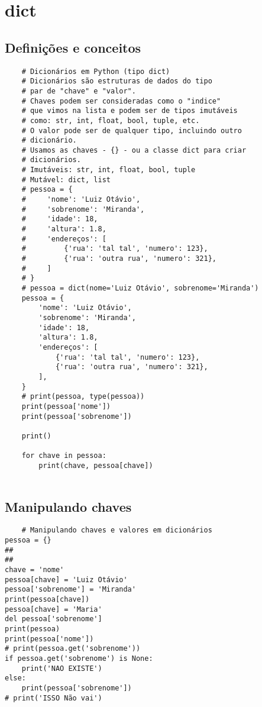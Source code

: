 \documentclass{article}
\begin{document}
\section{dict}
\subsection{Definições e conceitos}
\begin{lstlisting}
    # Dicionários em Python (tipo dict)
    # Dicionários são estruturas de dados do tipo
    # par de "chave" e "valor".
    # Chaves podem ser consideradas como o "indice"
    # que vimos na lista e podem ser de tipos imutáveis
    # como: str, int, float, bool, tuple, etc.
    # O valor pode ser de qualquer tipo, incluindo outro
    # dicionário.
    # Usamos as chaves - {} - ou a classe dict para criar
    # dicionários.
    # Imutáveis: str, int, float, bool, tuple
    # Mutável: dict, list
    # pessoa = {
    #     'nome': 'Luiz Otávio',
    #     'sobrenome': 'Miranda',
    #     'idade': 18,
    #     'altura': 1.8,
    #     'endereços': [
    #         {'rua': 'tal tal', 'numero': 123},
    #         {'rua': 'outra rua', 'numero': 321},
    #     ]
    # }
    # pessoa = dict(nome='Luiz Otávio', sobrenome='Miranda')
    pessoa = {
        'nome': 'Luiz Otávio',
        'sobrenome': 'Miranda',
        'idade': 18,
        'altura': 1.8,
        'endereços': [
            {'rua': 'tal tal', 'numero': 123},
            {'rua': 'outra rua', 'numero': 321},
        ],
    }
    # print(pessoa, type(pessoa))
    print(pessoa['nome'])
    print(pessoa['sobrenome'])
    
    print()
    
    for chave in pessoa:
        print(chave, pessoa[chave])   
    
\end{lstlisting}
\subsection{Manipulando chaves}
\begin{lstlisting}
    # Manipulando chaves e valores em dicionários
pessoa = {}
##
##
chave = 'nome'
pessoa[chave] = 'Luiz Otávio'
pessoa['sobrenome'] = 'Miranda'
print(pessoa[chave])
pessoa[chave] = 'Maria'
del pessoa['sobrenome']
print(pessoa)
print(pessoa['nome'])
# print(pessoa.get('sobrenome'))
if pessoa.get('sobrenome') is None:
    print('NAO EXISTE')
else:
    print(pessoa['sobrenome'])
# print('ISSO Não vai')
\end{lstlisting}
\end{document}

